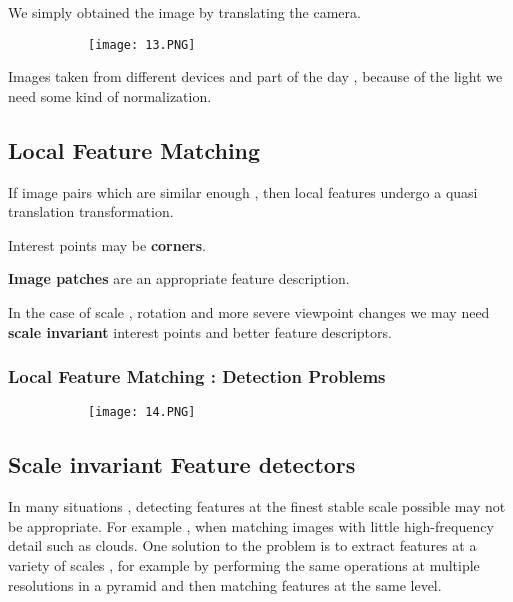 \documentclass{article}
\begin{document}
We simply obtained the image by translating the camera.

\begin{figure}[ht!]
  \centering
  \begin{subfigure}[b]{0.5\linewidth}
    \texttt{[image: 13.PNG]}
  \end{subfigure}
\end{figure}

Images taken from different devices and part of the day , because of the light we need some kind of normalization.

\subsection{Local Feature Matching}

If image pairs which are similar enough , then local features undergo a quasi translation transformation.

Interest points may be \textbf{corners}.

\textbf{Image patches} are an appropriate feature description.

In the case of scale , rotation and more severe viewpoint changes we may need \textbf{scale invariant} interest points and better feature descriptors.

\vspace{50mm}

\subsubsection{Local Feature Matching : Detection Problems}

\begin{figure}[ht!]
  \centering
  \begin{subfigure}[b]{0.8\linewidth}
    \texttt{[image: 14.PNG]}
  \end{subfigure}
\end{figure}

\subsection{Scale invariant Feature detectors}

In many situations , detecting features at the finest stable scale possible may not be appropriate. For example , when matching images with little high-frequency detail such as clouds.
One solution to the problem is to extract features at a variety of scales ,  for example by performing the same operations at multiple resolutions in a pyramid and then matching features at the same level.
\end{document}
